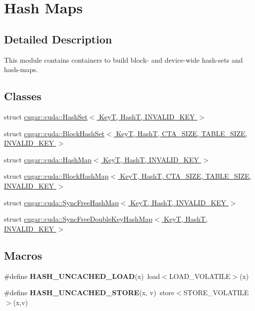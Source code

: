 \hypertarget{group___hash_maps_module}{}\section{Hash Maps}
\label{group___hash_maps_module}


\subsection{Detailed Description}
This module contains containers to build block-\/ and device-\/wide hash-\/sets and hash-\/maps. \subsection*{Classes}
\begin{DoxyCompactItemize}
\item 
struct \hyperlink{structcugar_1_1cuda_1_1_hash_set}{cugar\+::cuda\+::\+Hash\+Set$<$ Key\+T, Hash\+T, I\+N\+V\+A\+L\+I\+D\+\_\+\+K\+E\+Y $>$}
\item 
struct \hyperlink{structcugar_1_1cuda_1_1_block_hash_set}{cugar\+::cuda\+::\+Block\+Hash\+Set$<$ Key\+T, Hash\+T, C\+T\+A\+\_\+\+S\+I\+Z\+E, T\+A\+B\+L\+E\+\_\+\+S\+I\+Z\+E, I\+N\+V\+A\+L\+I\+D\+\_\+\+K\+E\+Y $>$}
\item 
struct \hyperlink{structcugar_1_1cuda_1_1_hash_map}{cugar\+::cuda\+::\+Hash\+Map$<$ Key\+T, Hash\+T, I\+N\+V\+A\+L\+I\+D\+\_\+\+K\+E\+Y $>$}
\item 
struct \hyperlink{structcugar_1_1cuda_1_1_block_hash_map}{cugar\+::cuda\+::\+Block\+Hash\+Map$<$ Key\+T, Hash\+T, C\+T\+A\+\_\+\+S\+I\+Z\+E, T\+A\+B\+L\+E\+\_\+\+S\+I\+Z\+E, I\+N\+V\+A\+L\+I\+D\+\_\+\+K\+E\+Y $>$}
\item 
struct \hyperlink{structcugar_1_1cuda_1_1_sync_free_hash_map}{cugar\+::cuda\+::\+Sync\+Free\+Hash\+Map$<$ Key\+T, Hash\+T, I\+N\+V\+A\+L\+I\+D\+\_\+\+K\+E\+Y $>$}
\item 
struct \hyperlink{structcugar_1_1cuda_1_1_sync_free_double_key_hash_map}{cugar\+::cuda\+::\+Sync\+Free\+Double\+Key\+Hash\+Map$<$ Key\+T, Hash\+T, I\+N\+V\+A\+L\+I\+D\+\_\+\+K\+E\+Y $>$}
\end{DoxyCompactItemize}
\subsection*{Macros}
\begin{DoxyCompactItemize}
\item 
\mbox{\label{group___hash_maps_module_ga2cfaa543423c177aae8900693f627960}} 
\#define {\bfseries H\+A\+S\+H\+\_\+\+U\+N\+C\+A\+C\+H\+E\+D\+\_\+\+L\+O\+AD}(x)~load$<$L\+O\+A\+D\+\_\+\+V\+O\+L\+A\+T\+I\+LE$>$(x)
\item 
\mbox{\label{group___hash_maps_module_ga6db637746c107e09fd9bb0392685a3d6}} 
\#define {\bfseries H\+A\+S\+H\+\_\+\+U\+N\+C\+A\+C\+H\+E\+D\+\_\+\+S\+T\+O\+RE}(x,  v)~store$<$S\+T\+O\+R\+E\+\_\+\+V\+O\+L\+A\+T\+I\+LE$>$(x,v)
\end{DoxyCompactItemize}

